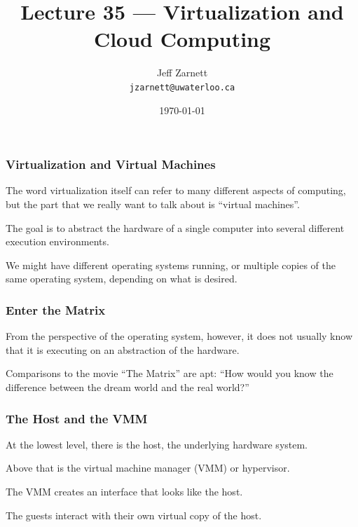 

\title{Lecture 35 --- Virtualization and Cloud Computing }

\author{Jeff Zarnett \\ \small \texttt{jzarnett@uwaterloo.ca}}
\date{\today}




\begin{frame}
  \titlepage

 \end{frame}



\begin{frame}
\frametitle{Virtualization and Virtual Machines}

The word virtualization itself can refer to many different aspects of computing, but the part that we really want to talk about is ``virtual machines''. 

The goal is to abstract the hardware of a single computer into several different execution environments. 

We might have different operating systems running, or multiple copies of the same operating system, depending on what is desired. 

\end{frame}

\begin{frame}
\frametitle{Enter the Matrix}

From the perspective of the operating system, however, it does not usually know that it is executing on an abstraction of the hardware. 

Comparisons to the movie ``The Matrix'' are apt: ``How would you know the difference between the dream world and the real world?''



\end{frame}

\begin{frame}
\frametitle{The Host and the VMM}


At the lowest level, there is the \alert{host}, the underlying hardware system. 

Above that is the \alert{virtual machine manager} (VMM) or \alert{hypervisor}.

The VMM creates an interface that looks like the host. 

The \alert{guests} interact with their own virtual copy of the host.

\end{frame}

